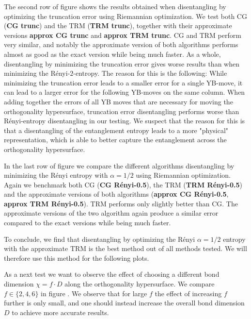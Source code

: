 The second row of figure  shows the results obtained when disentangling by optimizing the truncation error using Riemannian optimization.  We test both CG (\textbf{CG trunc}) and the TRM (\textbf{TRM trunc}), together with their approximate versions \textbf{approx CG trunc} and \textbf{approx TRM trunc}. CG and TRM perform very similar, and notably the approximate version of both algorithms performs almost as good as the exact version while being much faster. As a whole, disentangling by minimizing the truncation error gives worse results than when minimizing the Rényi-$2$-entropy. The reason for this is the following: While minimizing the truncation error leads to a smaller error for a single YB-move, it can lead to a larger error for the following YB-moves on the same column. When adding together the errors of all YB moves that are necessary for moving the orthogonality hypersurface, truncation error disentangling performs worse than Rényi-entropy disentangling in our testing. We suspect that the reason for this is that a disentangling of the entanglement entropy leads to a more "physical" representation, which is able to better capture the entanglement across the orthogonality hypersurface. \par
In the last row of figure  we compare the different algorithms disentangling by minimizing the Rényi entropy with $\alpha = 1/2$ using Riemannian optimization. Again we benchmark both CG (\textbf{CG Rényi-0.5}), the TRM (\textbf{TRM Rényi-0.5}) and the approximate versions of both algorithms (\textbf{approx CG Rényi-0.5}, \textbf{approx TRM Rényi-0.5}). TRM performs only slightly better than CG. The approximate versions of the two algorithm again produce a similar error compared to the exact versions while being much faster. \par
To conclude, we find that disentangling by optimizing the Rényi $\alpha=1/2$ entropy with the approximate TRM is the best method out of all methods tested. We will therefore use this method for the following plots. \par

As a next test we want to observe the effect of choosing a different bond dimension $\chi = f\cdot D$ along the orthogonality hypersurface. We compare $f \in\{2, 4, 6\}$ in figure . We observe that for large $f$ the effect of increasing $f$ further is only small, and one should instead increase the overall bond dimension $D$ to achieve more accurate results. \par
